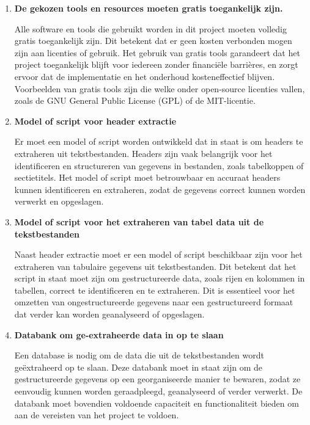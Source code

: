 \begin{enumerate}
    \item \textbf{De gekozen tools en resources moeten gratis toegankelijk zijn.}

        Alle software en tools die gebruikt worden in dit project moeten volledig gratis toegankelijk zijn. Dit betekent dat er geen kosten verbonden mogen zijn aan licenties of gebruik. Het gebruik van gratis tools garandeert dat het project toegankelijk blijft voor iedereen zonder financiële barrières, en zorgt ervoor dat de implementatie en het onderhoud kosteneffectief blijven. Voorbeelden van gratis tools zijn die welke onder open-source licenties vallen, zoals de GNU General Public License (GPL) of de MIT-licentie.

    
    \item \textbf{Model of script voor header extractie}

       Er moet een model of script worden ontwikkeld dat in staat is om headers te extraheren uit tekstbestanden. Headers zijn vaak belangrijk voor het identificeren en structureren van gegevens in bestanden, zoals tabelkoppen of sectietitels. Het model of script moet betrouwbaar en accuraat headers kunnen identificeren en extraheren, zodat de gegevens correct kunnen worden verwerkt en opgeslagen.

    
    \item \textbf{Model of script voor het extraheren van tabel data uit de tekstbestanden}

         Naast header extractie moet er een model of script beschikbaar zijn voor het extraheren van tabulaire gegevens uit tekstbestanden. Dit betekent dat het script in staat moet zijn om gestructureerde data, zoals rijen en kolommen in tabellen, correct te identificeren en te extraheren. Dit is essentieel voor het omzetten van ongestructureerde gegevens naar een gestructureerd formaat dat verder kan worden geanalyseerd of opgeslagen.

    
    \item \textbf{Databank om ge-extraheerde data in op te slaan}

         Een database is nodig om de data die uit de tekstbestanden wordt geëxtraheerd op te slaan. Deze databank moet in staat zijn om de gestructureerde gegevens op een georganiseerde manier te bewaren, zodat ze eenvoudig kunnen worden geraadpleegd, geanalyseerd of verder verwerkt. De databank moet bovendien voldoende capaciteit en functionaliteit bieden om aan de vereisten van het project te voldoen.

\end{enumerate}

